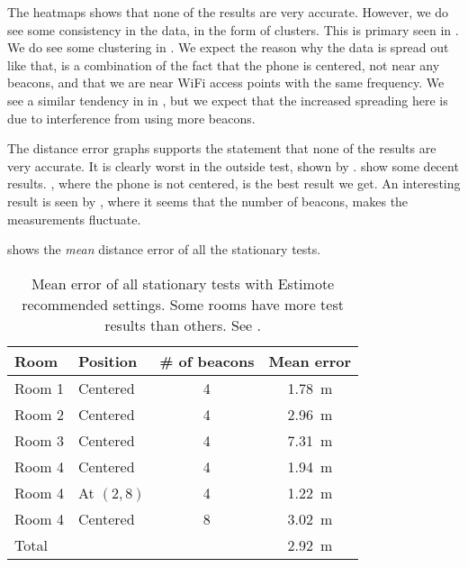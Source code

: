 The heatmaps shows that none of the results are very accurate. 
However, we do see some consistency in the data, in the form of clusters. 
This is primary seen in . 
We do see some clustering in . 
We expect the reason why the data is spread out like that, 
is a combination of the fact that the phone is centered, \ie not near any beacons,
and that we are near WiFi access points with the same frequency. 
We see a similar tendency in in , 
but we expect that the increased spreading here is due to interference from using more beacons. 

The distance error graphs supports the statement that none of the results are very accurate. 
It is clearly worst in the outside test, shown by . 
 show some decent results. 
, where the phone is not centered, 
is the best result we get. 
An interesting result is seen by ,
where it seems that the number of beacons, 
makes the measurements fluctuate. 

 shows the \emph{mean} distance error of all the stationary tests. 

\begin{table}[!htb]
  \centering
  \begin{tabular}{l|l c c}
  	Room   & Position   & \# of beacons & Mean error        \\ \hline
  	Room 1 & Centered   & \num{4}       & \SI{1.78}{\meter} \\
  	Room 2 & Centered   & \num{4}       & \SI{2.96}{\meter} \\
  	Room 3 & Centered   & \num{4}       & \SI{7.31}{\meter} \\
  	Room 4 & Centered   & \num{4}       & \SI{1.94}{\meter} \\
  	Room 4 & At $(2,8)$ & \num{4}       & \SI{1.22}{\meter} \\
  	Room 4 & Centered   & \num{8}       & \SI{3.02}{\meter} \\ \hline
  	Total  &            &               & \SI{2.92}{\meter}
  \end{tabular}
  \caption{Mean error of all stationary tests with Estimote recommended settings. Some rooms have more test results than others. See .}
  \label{table:meanerrorresults}
\end{table}

